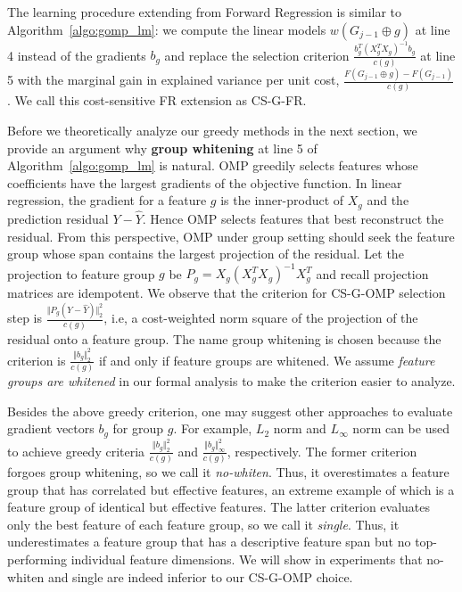 The learning procedure extending from Forward Regression is similar to
Algorithm~\ref{algo:gomp_lm}: we compute the linear models 
$w(G_{j-1} \oplus g)$ at line 4 instead of the 
gradients $b_g$ and replace the selection criterion $\frac{b_g ^T (X_{g}^TX_g)^{-1}b_g}{ c(g) }$ at line 5 with the marginal gain in explained 
variance per unit cost, $\frac{F(G_{j-1} \oplus g) - F(G_{j-1}) }{c(g)}$. We call this cost-sensitive FR extension as CS-G-FR.


Before we theoretically analyze our greedy methods
in the next section, we provide an argument 
why \textbf{group whitening} at line 5 of Algorithm~\ref{algo:gomp_lm} 
is natural. OMP greedily selects features whose
coefficients have the largest gradients of the objective function. 
In linear regression, the gradient for a feature $g$ 
is the inner-product of $X_g$ and the prediction 
residual $Y-\hat{Y}$. Hence OMP selects features that best reconstruct the 
residual. From this perspective, OMP under group setting 
should seek the feature group whose span contains the largest projection of the residual. 
Let the projection to feature group $g$ be 
$P_g = X_g(X_g^TX_g)^{-1}X_g^T$ and recall projection matrices are
idempotent. We observe that the criterion for CS-G-OMP selection step is
$\frac{\Vert P_g (Y - \hat{Y}) \Vert _2^2 }{c(g)}$, i.e, a cost-weighted
norm square of the projection of the residual onto a feature group. The 
name group whitening is chosen because the criterion is 
$\frac{\Vert b_g \Vert_2^2}{c(g)}$ if and only if feature groups are whitened. We assume \textit{feature groups are whitened} in our formal analysis to make the criterion easier to analyze. 

Besides the above greedy criterion, one may suggest other approaches 
to evaluate gradient vectors $b_g$ for group $g$. For example, 
$L_2$ norm and $L_{\infty}$ norm can be used to 
achieve greedy criteria $\frac{\Vert b_g \Vert_2^2}{c(g)}$ and 
$\frac{\Vert b_g \Vert ^2_{\infty}}{c(g)}$, respectively. 
The former criterion forgoes group whitening, so we call it \textit{no-whiten}.
Thus, it overestimates a feature group that has correlated 
but effective features, an extreme example of which is a
feature group of identical but effective features. The latter
criterion evaluates only the best feature of each feature group, so we call it \textit{single}. Thus, it
underestimates a feature group that has a descriptive 
feature span but no top-performing individual feature dimensions.
We will show in experiments that no-whiten and single
are indeed inferior to our CS-G-OMP choice. 

